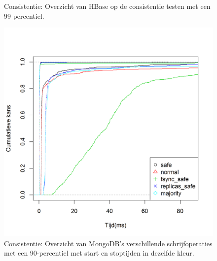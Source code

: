 \begin{figure}[ht!] 
	\centering

	\caption{Consistentie: Overzicht van HBase op de consistentie testen met een 99-percentiel.}
	\label{fig:consistentie-hbase}
\end{figure}

\begin{figure}[htb!] 
	\centering
	\includegraphics[width=.42\textwidth]{img/Observaties/MongoDB/ECDF-Compare-Write-insert-1}
	\caption{Consistentie: Overzicht van MongoDB's verschillende schrijfoperaties met een 90-percentiel met start en stoptijden in dezelfde kleur.  }
	\label{fig:consistentie-mongodb-all-mongodb-write}
\end{figure}

